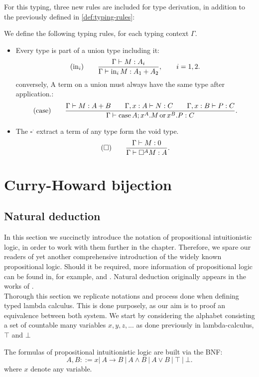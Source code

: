 For this typing, three new rules are included for type derivation, in addition to the previously defined in \ref{def:typing-rules}:
\begin{definition}
  We define the following typing rules, for each typing context $\Gamma$.
  \begin{itemize}
  \item Every type is part of a union type including it:
    $$  (\operatorname{in}_i)\qquad  {\displaystyle\Gamma \vdash M:A_i \over \Gamma \vdash \operatorname{in}_i M:A_1+A_2},\qquad  i=  1,2.$$
  conversely, A term on a union must always have the same type after application.:
    $$(\operatorname{case}) \qquad {\displaystyle \Gamma\vdash M: A+B\qquad \Gamma, x:A\vdash N: C\qquad \Gamma, x:B\vdash P: C \over \Gamma \vdash \operatorname{case}A ; x^{A}.M\operatorname{ or }x^{B}.P:C}.$$
  \item The $\square^\cdot$ extract a term of any type form the void type.
    $$  (\square)\qquad  {\displaystyle\Gamma \vdash M:0 \over \Gamma \vdash \square^A M:A}.$$
  \end{itemize}
\end{definition}
\section{Curry-Howard bijection}
\subsection{Natural deduction}
In this section we succinctly introduce the notation of propositional intuitionistic logic, in order to work with them further in the chapter. Therefore, we spare our readers of yet another comprehensive introduction of the widely known propositional logic. Should it be required, more information of propositional logic can be found in, for example, \cite{marek2009introduction} and \cite{wadler2015propositions}. Natural deduction originally appears in the works of \cite{gentzen1935untersuchungen}. \\

Thorough this section we replicate notations and process done when defining typed lambda calculus. This is done purposely, as our aim is to proof an equivalence between both system. We start by considering the alphabet consisting a set of countable many variables $x,y,z,...$ as done previously in lambda-calculus, $\top$ and $\bot$ 

\begin{definition}
  The formulas of propositional intuitionistic logic are built via the BNF:
  $$A,B ::= x |\ A\to B\ |\ A \land B \ |\ A \lor B \ |\ \top \ |\ \bot .$$
  where $x$ denote any variable.
\end{definition}


